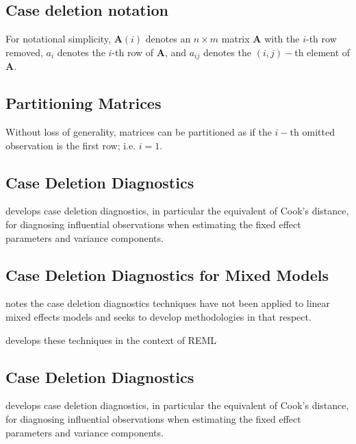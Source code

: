 \documentclass[MAIN.tex]{subfiles}
\begin{document}
\subsection{Case deletion notation} %

For notational simplicity, $\boldsymbol{A}(i)$ denotes an $n \times m$ matrix $\boldsymbol{A}$ with the $i$-th row
removed, $a_i$ denotes the $i$-th row of $\boldsymbol{A}$, and $a_{ij}$ denotes the $(i, j)-$th element of $\boldsymbol{A}$.

\subsection{Partitioning Matrices} %
Without loss of generality, matrices can be partitioned as if the $i-$th omitted observation is the first row; i.e. $i=1$.



\subsection{Case Deletion Diagnostics} %

\citet{CPJ} develops  case deletion diagnostics, in particular the equivalent of  Cook's distance, for diagnosing influential observations when estimating the fixed effect parameters and variance components.



\subsection{Case Deletion Diagnostics for Mixed Models}

\citet{Christiansen} notes the case deletion diagnostics techniques have not been applied to linear mixed effects models and seeks to develop methodologies in that respect.

\citet{Christiansen} develops these techniques in the context of REML


\newpage

\subsection{Case Deletion Diagnostics} %

\citet{CPJ} develops  case deletion diagnostics, in particular the equivalent of  Cook's distance, for diagnosing influential observations when estimating the fixed effect parameters and variance components.
\end{document}
